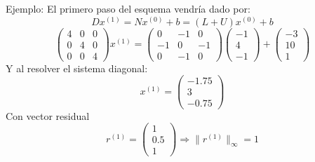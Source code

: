 \documentclass[10pt]{beamer}
\begin{document}
      \begin{frame}{Ejemplo:}     
        El primero paso del esquema vendr\'ia dado por:
        $$
        Dx^{(1)} = N x^{(0)} + b = (L + U )x^{(0)} + b
        $$
        $$
\left(\begin{array}{ccc}
       4 & 0 & 0\\
       0 & 4 & 0\\
       0 & 0 & 4
      \end{array}\right)x^{(1)}=\left(\begin{array}{ccc}
       0 & -1 & 0\\
       -1 & 0 & -1\\
       0 & -1 & 0
      \end{array}\right)\left(\begin{array}{c}
      -1\\
      4\\
      -1
      \end{array}\right)+\left(\begin{array}{c}
      -3\\
      10\\
      1
      \end{array}\right)
      $$
      Y al resolver el sistema diagonal:
$$
x^{(1)} = \left(\begin{array}{c}
      -1.75\\
      3\\
      -0.75
      \end{array}\right)
$$
Con vector residual
$$
r^{(1)} = \left(\begin{array}{c}
      1\\
      0.5\\
      1
      \end{array}\right) \Rightarrow \|r^{(1)}\|_\infty = 1
$$
      \end{frame}
\end{document}
